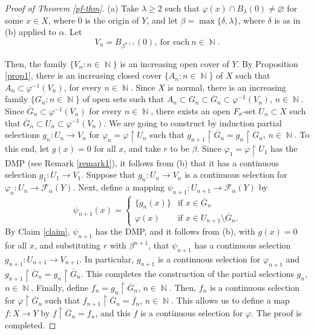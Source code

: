 \documentclass[12pt,a4paper,fleqn,leqno]{amsart}
\theoremstyle{plain}
\theoremstyle{definition}
\numberwithin{equation}{section}
\begin{document}
\begin{proof}[Proof of Theorem \ref{pf-thm}]
(a) Take $\lambda\geq2$ such that $\varphi(x)\cap B_{\lambda}(0)\neq{\varnothing}$ for some $x\in X$, where $0$ is the origin of $Y$, and let $\beta=\max\{\delta,\lambda\}$, where $\delta$ is as in (b) applied to $\alpha$. Let
\[
V_n=B_{\beta^{n+1}}(0),\ \text{for each}\ n\in\operatorname{\mathbb{N}}.
\]

Then, the family $\{V_n:n\in\operatorname{\mathbb{N}}\}$ is an increasing open cover of $Y$. By Proposition \ref{prop1}, there is an increasing closed cover $\{A_n:n\in\operatorname{\mathbb{N}}\}$ of $X$ such that
$A_n\subset\varphi^{-1}(V_n)$, for every $n\in\operatorname{\mathbb{N}}$. Since $X$ is normal, there is an increasing family $\{G_n:n\in\operatorname{\mathbb{N}}\}$ of open sets such that $A_n\subset G_n\subset \overline{G}_n\subset\varphi^{-1}(V_n)$, $n\in\operatorname{\mathbb{N}}$. Since $\overline{G}_n\subset \varphi^{-1}(V_n)$ for every $n\in\operatorname{\mathbb{N}}$, there exists an open $F_{\sigma}$-set $U_n\subset X$ such that $\overline{G}_n\subset U_n\subset\varphi^{-1}(V_n)$. We are going to construct by induction partial selections $g_n:U_n\to V_n$ for $\varphi_n=\varphi\operatorname{\upharpoonright} U_n$ such that $g_{n+1}\operatorname{\upharpoonright}\overline{G}_n=g_n\operatorname{\upharpoonright}\overline{G}_n$, $n\in\operatorname{\mathbb{N}}$. To this end, let $g(x)=0$ for all $x$, and take $r$ to be $\beta$. Since $\varphi_1=\varphi\operatorname{\upharpoonright} U_1$ has the DMP (see Remark \ref{remark1}), it follows from (b) that it has a continuous selection $g_1:U_1\to V_1$. Suppose that $g_n:U_n\to V_n$ is a continuous selection for $\varphi_n:U_n\to \mathscr{F}_{\alpha}(Y)$. Next, define a mapping $\psi_{n+1}:U_{n+1}\to \mathscr{F}_{\alpha}(Y)$ by
\begin{displaymath}
\psi_{n+1}(x)=\left\{\begin{array}{ll}
      \{g_n(x)\} & \textrm{if $x\in\overline{G}_n$}\\
      \varphi(x) & \textrm{if $x\in U_{n+1}\setminus\overline{G}_n.$}
      \end{array}\right.
\end{displaymath}
By Claim \ref{claim}, $\psi_{n+1}$ has the DMP, and it follows from (b), with $g(x)=0$ for all $x$, and substituting $r$ with $\beta^{n+1}$, that $\psi_{n+1}$ has a continuous selection $g_{n+1}:U_{n+1}\to V_{n+1}$. In particular, $g_{n+1}$ is a continuous selection for $\varphi_{n+1}$ and $g_{n+1}\operatorname{\upharpoonright}\overline{G}_n=g_n\operatorname{\upharpoonright}\overline{G}_n$. This completes the construction of the partial selections $g_n$, $n\in\operatorname{\mathbb{N}}$. Finally, define
$f_n=g_n\operatorname{\upharpoonright}\overline{G}_n$, $n\in\operatorname{\mathbb{N}}$. Then, $f_n$ is a continuous selection for $\varphi\operatorname{\upharpoonright}\overline{G}_n$ such that $f_{n+1}\operatorname{\upharpoonright}\overline{G}_n=f_n$, $n\in\operatorname{\mathbb{N}}$. This allows us to define a map $f:X\to Y$ by $f\operatorname{\upharpoonright}\overline{G}_n=f_n$, and this $f$ is a continuous
selection for $\varphi$. The proof is completed.
\end{proof}
\end{document}
